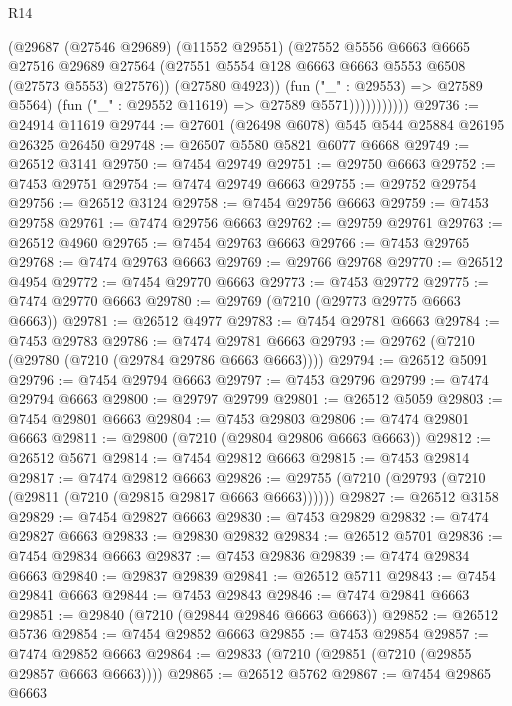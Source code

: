\begin{lexlean}{R14}
\begin{coremodule}
                        (@29687
                          (@27546 @29689)
                          (@11552 @29551)
                          (@27552
                            @5556
                            @6663
                            @6665
                            @27516
                            @29689
                            @27564
                            (@27551 @5554 @128 @6663 @6663 @5553 @6508 (@27573 @5553) @27576))
                          (@27580 @4923))
                        (fun ("_" : @29553) => @27589 @5564)
                        (fun ("_" : @29552 @11619) => @27589 @5571)))))))))))
@29736 := @24914 @11619
@29744 := @27601 (@26498 @6078) @545 @544 @25884 @26195 @26325 @26450
@29748 := @26507 @5580 @5821 @6077 @6668
@29749 := @26512 @3141
@29750 := @7454 @29749
@29751 := @29750 @6663
@29752 := @7453 @29751
@29754 := @7474 @29749 @6663
@29755 := @29752 @29754
@29756 := @26512 @3124
@29758 := @7454 @29756 @6663
@29759 := @7453 @29758
@29761 := @7474 @29756 @6663
@29762 := @29759 @29761
@29763 := @26512 @4960
@29765 := @7454 @29763 @6663
@29766 := @7453 @29765
@29768 := @7474 @29763 @6663
@29769 := @29766 @29768
@29770 := @26512 @4954
@29772 := @7454 @29770 @6663
@29773 := @7453 @29772
@29775 := @7474 @29770 @6663
@29780 := @29769 (@7210 (@29773 @29775 @6663 @6663))
@29781 := @26512 @4977
@29783 := @7454 @29781 @6663
@29784 := @7453 @29783
@29786 := @7474 @29781 @6663
@29793 := @29762 (@7210 (@29780 (@7210 (@29784 @29786 @6663 @6663))))
@29794 := @26512 @5091
@29796 := @7454 @29794 @6663
@29797 := @7453 @29796
@29799 := @7474 @29794 @6663
@29800 := @29797 @29799
@29801 := @26512 @5059
@29803 := @7454 @29801 @6663
@29804 := @7453 @29803
@29806 := @7474 @29801 @6663
@29811 := @29800 (@7210 (@29804 @29806 @6663 @6663))
@29812 := @26512 @5671
@29814 := @7454 @29812 @6663
@29815 := @7453 @29814
@29817 := @7474 @29812 @6663
@29826 := @29755 (@7210 (@29793 (@7210 (@29811 (@7210 (@29815 @29817 @6663 @6663))))))
@29827 := @26512 @3158
@29829 := @7454 @29827 @6663
@29830 := @7453 @29829
@29832 := @7474 @29827 @6663
@29833 := @29830 @29832
@29834 := @26512 @5701
@29836 := @7454 @29834 @6663
@29837 := @7453 @29836
@29839 := @7474 @29834 @6663
@29840 := @29837 @29839
@29841 := @26512 @5711
@29843 := @7454 @29841 @6663
@29844 := @7453 @29843
@29846 := @7474 @29841 @6663
@29851 := @29840 (@7210 (@29844 @29846 @6663 @6663))
@29852 := @26512 @5736
@29854 := @7454 @29852 @6663
@29855 := @7453 @29854
@29857 := @7474 @29852 @6663
@29864 := @29833 (@7210 (@29851 (@7210 (@29855 @29857 @6663 @6663))))
@29865 := @26512 @5762
@29867 := @7454 @29865 @6663

\end{coremodule}
\end{lexlean}
